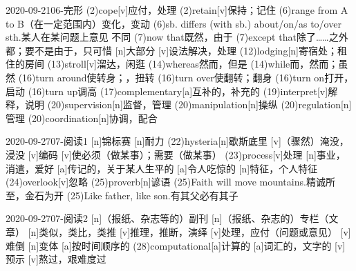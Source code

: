 \documentclass[12pt]{ctexart}
\begin{document}
\begin{wordlist}{2020-09-21}{06-完形}
  \word[2020-09-23](2){cope}[v]{应付，处理}
  \word[2020-09-25](2){retain}[v]{保持；记住}
  \word(6){range from A to B}{（在一定范围内）变化，变动}
  \word(6){sb. differs (with sb.) about/on/as to/over sth.}{某人在某问题上意见
  不同}
  \word(7){now that}{既然，由于}
  \word(7){except that}{除了……之外都；要不是由于，只可惜}
  [n]{大部分}
  [v]{设法解决，处理}
  \word(12){lodging}[n]{寄宿处；租住的房间}
  \word[2020-09-27](13){stroll}[v]{溜达，闲逛}
  \word(14){whereas}{然而，但是}
  \word(14){while}{而，然而；虽然}
  \word[2020-09-25](16){turn around}{使转身；，扭转}
  \word(16){turn over}{使翻转；翻身}
  \word(16){turn on}{打开，启动}
  \word(16){turn up}{调高}
  \word[2020-09-27](17){complementary}[a]{互补的，补充的}
  \word[2020-09-28](19){interpret}[v]{解释，说明}
  \word(20){supervision}[n]{监督，管理}
  \word[2020-09-23](20){manipulation}[n]{操纵}
  \word(20){regulation}[n]{管理}
  \word[2020-09-23](20){coordination}[n]{协调，配合}
\end{wordlist}
\begin{wordlist}{2020-09-27}{07-阅读1}
  [n]{锦标赛}
  [n]{耐力}
  \word(22){hysteria}[n]{歇斯底里}
  [v]{（骤然）淹没，浸没}
  [v]{编码}
  [v]{使必须（做某事）；需要（做某事）}
  \word(23){process}[v]{处理}
  [n]{事业，消遣，爱好}
  [a]{传记的，关于某人生平的}
  [a]{令人吃惊的}
  [n]{特征，个人特征}
  \word(24){overlook}[v]{忽略}
  \word(25){proverb}[n]{谚语}
  \word(25){Faith will move mountains.}{精诚所至，金石为开}
  \word(25){{Like father, like son.}}{有其父必有其子}
\end{wordlist}
\begin{wordlist}{2020-09-27}{07-阅读2}
  [n]{（报纸、杂志等的）副刊}
  [n]{（报纸、杂志的）专栏（文章）}
  [n]{类似，类比，类推}
  [v]{推理，推断，演绎}
  [v]{处理，应付（问题或意见）}
  [v]{难倒}
  [n]{变体}
  [a]{按时间顺序的}
  \word(28){computational}[a]{计算的}
  [a]{词汇的，文字的}
  [v]{预示}
  [v]{熬过，艰难度过}
\end{wordlist}
\end{document}

